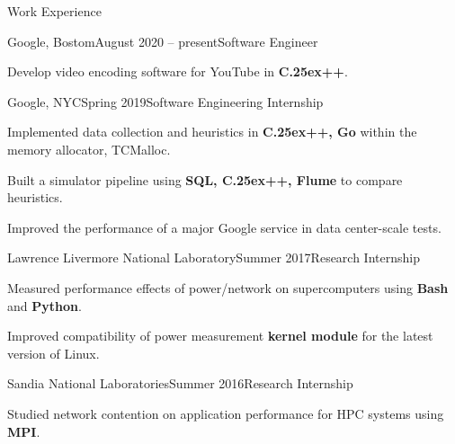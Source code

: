 \documentclass{resume}
\def\bfCplusplus{{\rm{\bf C\raise.25ex\hbox{\small ++}}}}
\begin{document}
\begin{rSection}{Work Experience}

\begin{rWorksection}{Google, Bostom}{August 2020 -- present}{Software Engineer}
\item Develop video encoding software for YouTube in {\bf \bfCplusplus{}}.
\end{rWorksection}

\begin{rWorksection}{Google, NYC}{Spring 2019}{Software Engineering
    Internship}
\item Implemented data collection and heuristics in {\bf \bfCplusplus{}, Go} within the memory
  allocator, TCMalloc.
\item Built a simulator pipeline using {\bf SQL, \bfCplusplus{}, Flume} to
  compare heuristics.
\item Improved the performance of a major Google service in data center-scale tests.
\end{rWorksection}

\begin{rWorksection}{Lawrence Livermore National Laboratory}{Summer
    2017}{Research Internship}
\item Measured performance effects of power/network on supercomputers using {\bf
    Bash} and {\bf Python}.
\item Improved compatibility of power measurement {\bf kernel module} for the
  latest version of Linux.
\end{rWorksection}


\begin{rWorksection}{Sandia National Laboratories}{Summer 2016}{Research
    Internship}
\item Studied network contention on application performance for HPC systems
  using {\bf MPI}.
\end{rWorksection}

\end{rSection}
\end{document}
